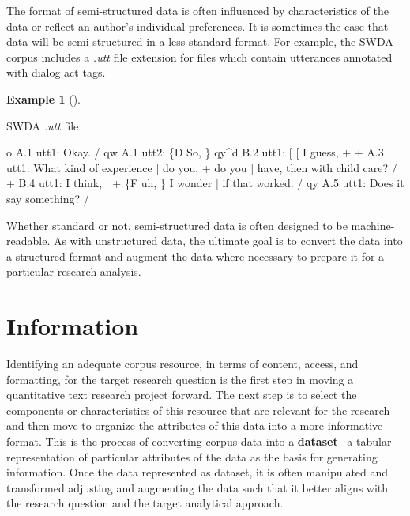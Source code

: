 \documentclass[
  letterpaper,
]{latex/krantz}
\newenvironment{Shaded}{\begin{snugshade}}{\end{snugshade}}
\newcommand{\NormalTok}[1]{\textcolor[rgb]{0.00,0.00,0.00}{#1}}
\theoremstyle{definition}
\newtheorem{example}{Example}[chapter]
\theoremstyle{remark}
\begin{document}
The format of semi-structured data is often influenced by
characteristics of the data or reflect an author's individual
preferences. It is sometimes the case that data will be semi-structured
in a less-standard format. For example, the SWDA corpus includes a
\emph{.utt} file extension for files which contain utterances annotated
with dialog act tags.

\begin{example}[]\protect\hypertarget{exm-swda-utt}{}\label{exm-swda-utt}

SWDA \emph{.utt} file

\begin{Shaded}
\begin{Highlighting}[]
\NormalTok{o      A.1 utt1: Okay.  /}
\NormalTok{qw     A.1 utt2: \{D So, \}}
\NormalTok{qy\^{}d   B.2 utt1: [ [ I guess, +}
\NormalTok{+      A.3 utt1: What kind of experience [ do you, + do you ] have, then}
\NormalTok{                 with child care? /}
\NormalTok{+      B.4 utt1: I think, ] + \{F uh, \} I wonder ] if that worked. /}
\NormalTok{qy     A.5 utt1: Does it say something? /}
\end{Highlighting}
\end{Shaded}

\end{example}

Whether standard or not, semi-structured data is often designed to be
machine-readable. As with unstructured data, the ultimate goal is to
convert the data into a structured format and augment the data where
necessary to prepare it for a particular research analysis.

\section{Information}\label{information}

Identifying an adequate corpus resource, in terms of content, access,
and formatting, for the target research question is the first step in
moving a quantitative text research project forward. The next step is to
select the components or characteristics of this resource that are
relevant for the research and then move to organize the attributes of
this data into a more informative format. This is the process of
converting corpus data into a \textbf{dataset} --a
tabular representation of particular attributes of the data as the basis
for generating information. Once the data represented as dataset, it is
often manipulated and transformed adjusting and augmenting the data such
that it better aligns with the research question and the target
analytical approach.
\end{document}
